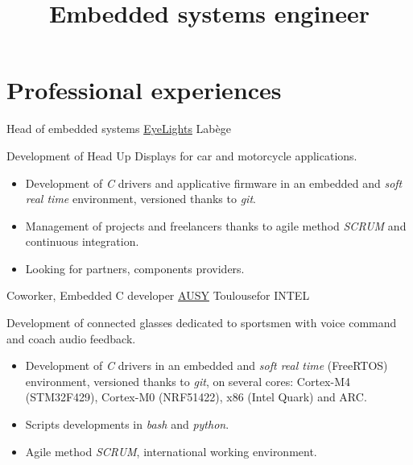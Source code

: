 \documentclass[10pt,a4paper,sans]{moderncv}
\title{Embedded systems engineer} %
\begin{document}
\makecvtitle

\section{Professional experiences}
	{Head of embedded systems}
	{\href{https://www.eye-lights.com/}{EyeLights}}
	{Labège}{}
	{Development of Head Up Displays for car and motorcycle applications.
\begin{addmargin}[1em]{1em}%
\begin{itemize}
\item Development of \emph{C} drivers and applicative firmware in an embedded and \emph{soft real time} environment, versioned thanks to \emph{git}.
\item Management of projects and freelancers thanks to agile method \emph{SCRUM} and continuous integration.
\item Looking for partners, components providers.
\end{itemize}
\end{addmargin}
}

	{Coworker, Embedded C developer}
	{\href{http://www.ausy.fr/}{AUSY}}
	{Toulouse}{for INTEL}
	{Development of connected glasses dedicated to sportsmen with voice command and coach audio feedback.
\begin{addmargin}[1em]{1em}%
\begin{itemize}
\item Development of \emph{C} drivers in an embedded and \emph{soft real time} (FreeRTOS) environment, versioned thanks to \emph{git}, on several cores: Cortex-M4 (STM32F429), Cortex-M0 (NRF51422), x86 (Intel Quark) and ARC.
\item Scripts developments in \emph{bash} and \emph{python}.
\item Agile method \emph{SCRUM}, international working environment.
\end{itemize}
\end{addmargin}
}
\end{document}

